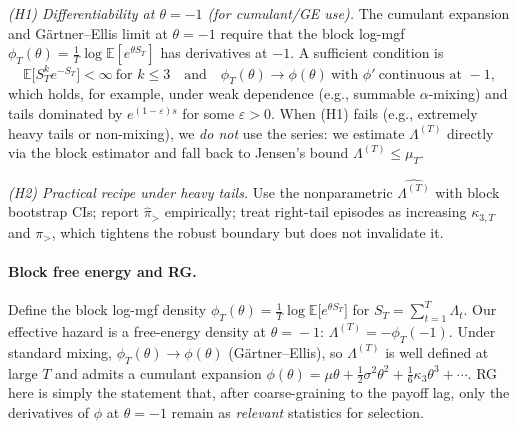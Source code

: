 \documentclass[11pt]{article}
\theoremstyle{upright}
\newcommand{\E}{\mathbb{E}}
\newcommand{\hazT}[1]{\Lambda^{(#1)}}          %
\begin{document}
\emph{(H1) Differentiability at \(\theta=-1\) (for cumulant/GE use).} The cumulant expansion and Gärtner–Ellis limit at \(\theta=-1\) require that the block log-mgf \(\phi_T(\theta)=\tfrac{1}{T}\log\E[e^{\theta S_T}]\) has derivatives at \(-1\). A sufficient condition is
\[
\E\!\big[S_T^k e^{-S_T}\big]<\infty\ \text{for }k\le 3\quad\text{and}\quad \phi_T(\theta)\to\phi(\theta)\ \text{with }\phi'\ \text{continuous at }-1,
\]
which holds, for example, under weak dependence (e.g., summable \(\alpha\)-mixing) and tails dominated by \(e^{(1-\varepsilon) s}\) for some \(\varepsilon>0\). When (H1) fails (e.g., extremely heavy tails or non-mixing), we \emph{do not} use the series: we estimate \(\hazT{T}\) directly via the block estimator and fall back to Jensen’s bound \(\hazT{T}\le \mu_T\).

\emph{(H2) Practical recipe under heavy tails.} Use the nonparametric \(\widehat{\hazT{T}}\) with block bootstrap CIs; report \(\widehat{\pi}_{>}\) empirically; treat right-tail episodes as increasing \(\kappa_{3,T}\) and \(\pi_{>}\), which tightens the robust boundary but does not invalidate it.

\paragraph{Block free energy and RG.}
Define the block log-mgf density $\phi_T(\theta)=\tfrac1T \log \mathbb E\!\big[e^{\theta S_T}\big]$ for $S_T=\sum_{t=1}^T\Lambda_t$.
Our effective hazard is a free-energy density at $\theta\!=\!-1$: $\hazT{T}=-\phi_T(-1)$.
Under standard mixing, $\phi_T(\theta)\to\phi(\theta)$ (Gärtner–Ellis), so $\hazT{T}$ is well defined at large $T$ and admits a
cumulant expansion $\phi(\theta)=\mu\theta+\tfrac12\sigma^2\theta^2+\tfrac16\kappa_3\theta^3+\cdots$.
RG here is simply the statement that, after coarse-graining to the payoff lag, only the derivatives of $\phi$ at $\theta=-1$
remain as \emph{relevant} statistics for selection.
\end{document}

